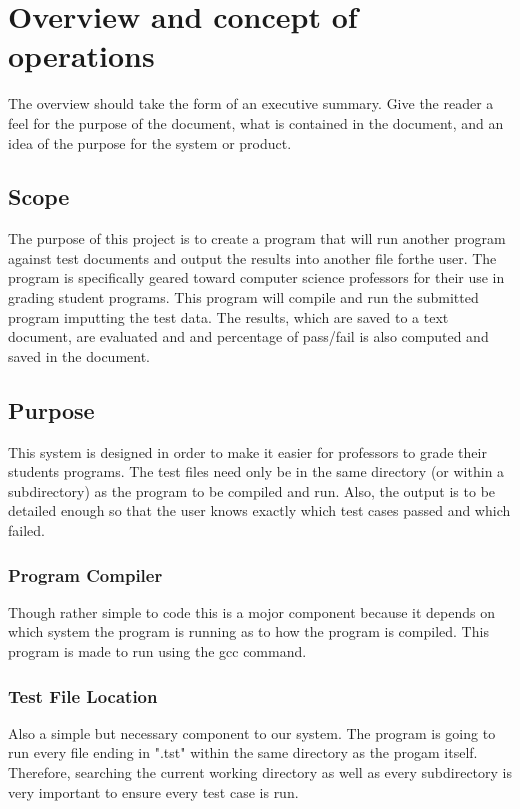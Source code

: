 
\chapter{Overview and concept of operations}

The overview should take the form of an executive summary.  Give the reader a feel 
for the purpose of the document, what is contained in the document, and an idea 
of the purpose for the system or product. 


\section{Scope}
The purpose of this project is to create a program that will run another program against test documents and output the 
results into another file forthe user. The program is specifically geared toward computer science professors for their use in 
grading student programs. This program will compile and run the submitted program imputting the test data. The results, which are saved to a text document, are evaluated and and percentage of pass/fail is also computed and saved in the
document.


\section{Purpose}
This system is designed in order to make it easier for professors to grade their students programs. The test files need only be 
in the same directory (or within a subdirectory) as the program to be compiled and run. Also, the output is to be detailed 
enough so that the user knows exactly which test cases passed and which failed.


\subsection{Program Compiler}
Though rather simple to code this is a mojor component because it depends on which system the program is running as to
how the program is compiled. This program is made to run using the gcc command.

\subsection{Test File Location}
Also a simple but necessary component to our system. The program is going to run every file ending in ".tst" within the same
directory as the progam itself. Therefore, searching the current working directory as well as every subdirectory is very 
important to ensure every test case is run.


